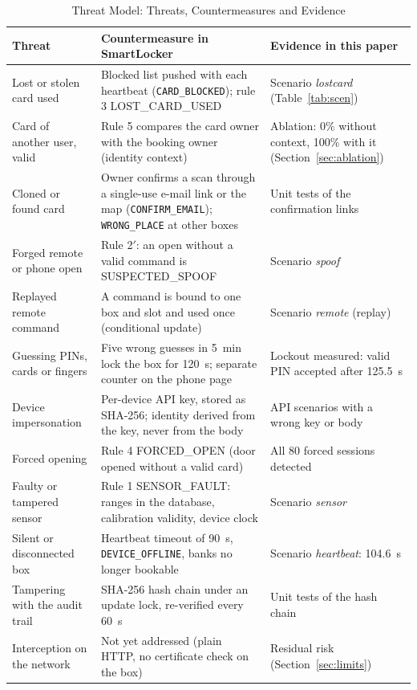 \begin{table}[t]
\centering
\small
\caption{Threat Model: Threats, Countermeasures and Evidence}
\label{tab:threat}
\begin{tabular}{p{4.0cm} p{7.4cm} p{5.2cm}}
\toprule
Threat & Countermeasure in SmartLocker & Evidence in this paper \\
\midrule
Lost or stolen card used & Blocked list pushed with each heartbeat (\texttt{CARD\_BLOCKED}); rule 3 LOST\_CARD\_USED & Scenario \emph{lostcard} (Table~\ref{tab:scen}) \\
Card of another user, valid & Rule 5 compares the card owner with the booking owner (identity context) & Ablation: 0\% without context, 100\% with it (Section~\ref{sec:ablation}) \\
Cloned or found card & Owner confirms a scan through a single-use e-mail link or the map (\texttt{CONFIRM\_EMAIL}); \texttt{WRONG\_PLACE} at other boxes & Unit tests of the confirmation links \\
Forged remote or phone open & Rule 2$'$: an open without a valid command is SUSPECTED\_SPOOF & Scenario \emph{spoof} \\
Replayed remote command & A command is bound to one box and slot and used once (conditional update) & Scenario \emph{remote} (replay) \\
Guessing PINs, cards or fingers & Five wrong guesses in 5~min lock the box for 120~s; separate counter on the phone page & Lockout measured: valid PIN accepted after 125.5~s \\
Device impersonation & Per-device API key, stored as SHA-256; identity derived from the key, never from the body & API scenarios with a wrong key or body \\
Forced opening & Rule 4 FORCED\_OPEN (door opened without a valid card) & All 80 forced sessions detected \\
Faulty or tampered sensor & Rule 1 SENSOR\_FAULT: ranges in the database, calibration validity, device clock & Scenario \emph{sensor} \\
Silent or disconnected box & Heartbeat timeout of 90~s, \texttt{DEVICE\_OFFLINE}, banks no longer bookable & Scenario \emph{heartbeat}: 104.6~s \\
Tampering with the audit trail & SHA-256 hash chain under an update lock, re-verified every 60~s & Unit tests of the hash chain \\
Interception on the network & Not yet addressed (plain HTTP, no certificate check on the box) & Residual risk (Section~\ref{sec:limits}) \\
\bottomrule
\end{tabular}
\end{table}

